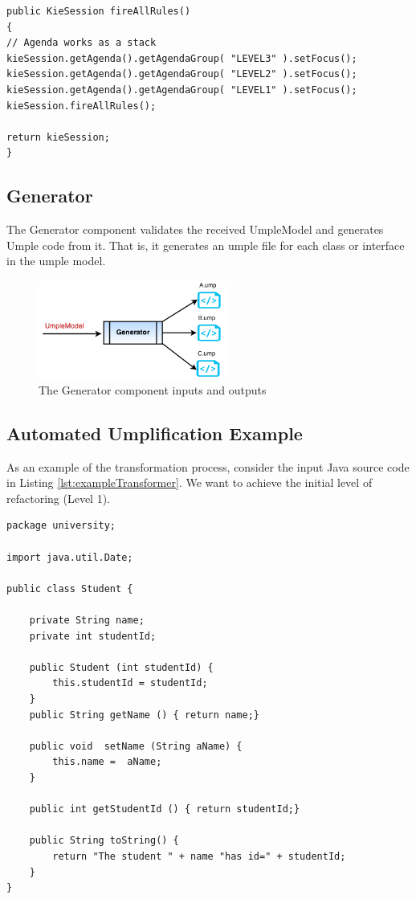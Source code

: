 \begin{lstlisting}[style=java, caption=Firing the rules in the Umplificator, label=lst:fireAllRules]
public KieSession fireAllRules()
{
// Agenda works as a stack
kieSession.getAgenda().getAgendaGroup( "LEVEL3" ).setFocus();
kieSession.getAgenda().getAgendaGroup( "LEVEL2" ).setFocus();
kieSession.getAgenda().getAgendaGroup( "LEVEL1" ).setFocus();
kieSession.fireAllRules();

return kieSession;
}
\end{lstlisting}

\subsection{Generator}

The Generator component validates the received UmpleModel and generates Umple code from it. That is, it generates an umple file for each class or interface in the umple model.

\begin{figure}[h]
\centering
\includegraphics[width=0.55\textwidth]{Figures/generatorINOut.png}
\caption{The Generator component inputs and outputs}
\label{fig:generatorInOut}
\end{figure}

\subsection{Automated Umplification Example}

As an example of the transformation process, consider the input Java source code in Listing \ref{lst:exampleTransformer}.
We want to achieve the initial level of refactoring (Level 1).

\begin{lstlisting}[style=java, caption=Input source code, label=lst:exampleTransformer]
package university;

import java.util.Date;

public class Student {
	
    private String name;
    private int studentId;
    
    public Student (int studentId) {
    	this.studentId = studentId;
    }
    public String getName () { return name;}
    
    public void  setName (String aName) { 
    	this.name =  aName;
    }
   
    public int getStudentId () { return studentId;}
    
    public String toString() {
    	return "The student " + name "has id=" + studentId;
    }
}   
\end{lstlisting}


